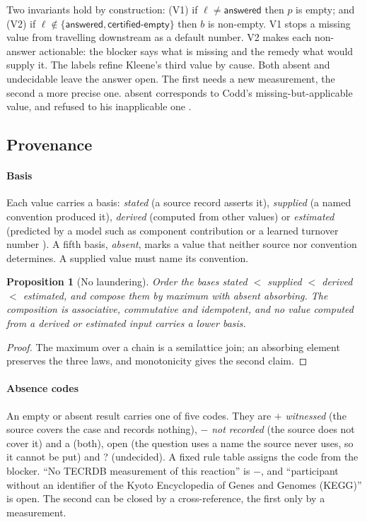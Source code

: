 \documentclass[5p]{elsarticle}
\theoremstyle{definition}
\theoremstyle{plain}
\newtheorem{proposition}{Proposition}
\newcommand{\st}[1]{\textsf{#1}}            %
\begin{document}
Two invariants hold by construction:
(V1) if $\ell\ne\st{answered}$ then $p$ is empty; and
(V2) if $\ell\notin\{\st{answered},\st{certified-empty}\}$ then $b$ is non-empty.
V1 stops a missing value from travelling downstream as a default number.
V2 makes each non-answer actionable: the blocker says what is missing and the remedy what would supply it.
The labels refine Kleene's third value by cause.
Both \st{absent} and \st{undecidable} leave the answer open.
The first needs a new measurement, the second a more precise one.
\st{absent} corresponds to Codd's missing-but-applicable value, and \st{refused} to his inapplicable one \citep{codd1986missing}.

\subsection{Provenance}
\label{sec:provenance}

\paragraph{Basis}
Each value carries a basis: \emph{stated} (a source record asserts it), \emph{supplied} (a named convention produced it), \emph{derived} (computed from other values) or \emph{estimated} (predicted by a model such as component contribution \citep{noor2013component} or a learned turnover number \citep{li2022dlkcat}).
A fifth basis, \emph{absent}, marks a value that neither source nor convention determines.
A supplied value must name its convention.

\begin{proposition}[No laundering]
\label{prop:basis}
Order the bases stated $<$ supplied $<$ derived $<$ estimated, and compose them by maximum with absent absorbing.
The composition is associative, commutative and idempotent, and no value computed from a derived or estimated input carries a lower basis.
\end{proposition}
\begin{proof}
The maximum over a chain is a semilattice join; an absorbing element preserves the three laws, and monotonicity gives the second claim.
\end{proof}

\paragraph{Absence codes}
An empty or absent result carries one of five codes.
They are $+$ \emph{witnessed} (the source covers the case and records nothing), $-$ \emph{not recorded} (the source does not cover it) and \textsf{a} (both), \textsf{open} (the question uses a name the source never uses, so it cannot be put) and \textsf{?} (undecided).
A fixed rule table assigns the code from the blocker.
``No TECRDB measurement of this reaction'' is $-$, and ``participant without an identifier of the Kyoto Encyclopedia of Genes and Genomes (KEGG)'' is \textsf{open}.
The second can be closed by a cross-reference, the first only by a measurement.
\end{document}
